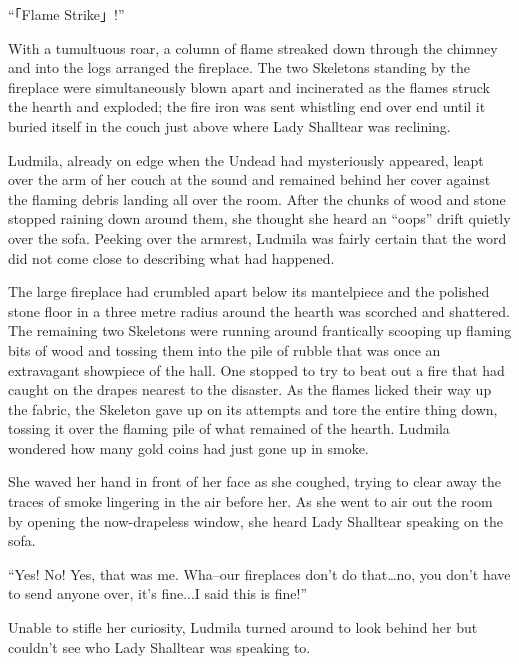  

“「Flame Strike」!”

 

With a tumultuous roar, a column of flame streaked down through the chimney and into the logs arranged the fireplace. The two Skeletons standing by the fireplace were simultaneously blown apart and incinerated as the flames struck the hearth and exploded; the fire iron was sent whistling end over end until it buried itself in the couch just above where Lady Shalltear was reclining.

 

Ludmila, already on edge when the Undead had mysteriously appeared, leapt over the arm of her couch at the sound and remained behind her cover against the flaming debris landing all over the room. After the chunks of wood and stone stopped raining down around them, she thought she heard an “oops” drift quietly over the sofa. Peeking over the armrest, Ludmila was fairly certain that the word did not come close to describing what had happened.

 

The large fireplace had crumbled apart below its mantelpiece and the polished stone floor in a three metre radius around the hearth was scorched and shattered. The remaining two Skeletons were running around frantically scooping up flaming bits of wood and tossing them into the pile of rubble that was once an extravagant showpiece of the hall. One stopped to try to beat out a fire that had caught on the drapes nearest to the disaster. As the flames licked their way up the fabric, the Skeleton gave up on its attempts and tore the entire thing down, tossing it over the flaming pile of what remained of the hearth. Ludmila wondered how many gold coins had just gone up in smoke.

 

She waved her hand in front of her face as she coughed, trying to clear away the traces of smoke lingering in the air before her. As she went to air out the room by opening the now-drapeless window, she heard Lady Shalltear speaking on the sofa.

 

“Yes! No! Yes, that was me. Wha–our fireplaces don’t do that…no, you don’t have to send anyone over, it’s fine...I said this is fine!”

 

Unable to stifle her curiosity, Ludmila turned around to look behind her but couldn’t see who Lady Shalltear was speaking to.

